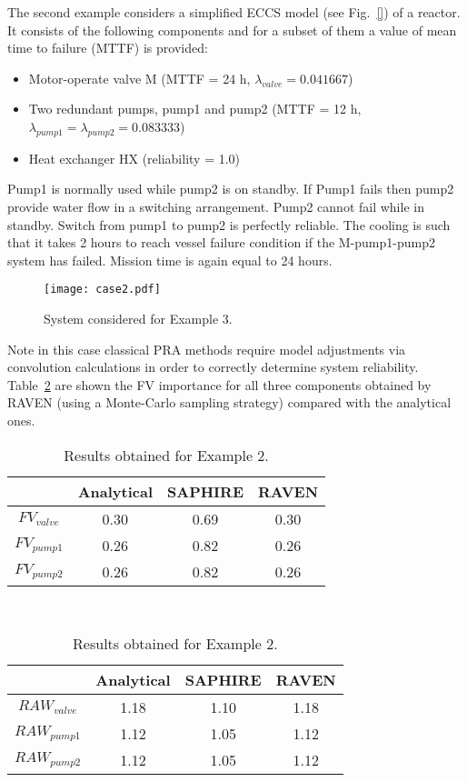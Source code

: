 The second example considers a simplified ECCS model (see Fig.~\ref{}) of a reactor. 
It consists of the following components and for a subset of them a 
value of mean time to failure (MTTF) is provided:
\begin{itemize}
  \item Motor-operate valve M (MTTF = 24 h, $\lambda_{valve} = 0.041667$)
  \item Two redundant pumps, pump1 and pump2 
        (MTTF = 12 h, $\lambda_{pump1} = \lambda_{pump2} = 0.083333$)
  \item Heat exchanger HX (reliability = 1.0)
\end{itemize}

Pump1 is normally used while pump2 is on standby. If Pump1 fails then pump2 provide water flow 
in a switching arrangement. 
Pump2 cannot fail while in standby. Switch from pump1 to pump2 is perfectly reliable. 
The cooling is such that it takes 2 hours to reach vessel failure condition if the 
M-pump1-pump2 
system has failed. Mission time is again equal to 24 hours.

\begin{figure}
    \centering
    \centerline{\texttt{[image: case2.pdf]}}
    \caption{System considered for Example 3.}
    \label{fig:example3}
\end{figure}

Note in this case classical PRA methods require model adjustments via convolution calculations
in order to correctly 
determine system reliability.
Table~\ref{tab:example2} are shown the FV importance for all three components obtained by RAVEN (using a Monte-Carlo 
sampling strategy) compared with the analytical ones.

\begin{table}
    \caption{Results obtained for Example 2.}
    \begin{minipage}{.5\linewidth}
      \centering
      \begin{tabular}{c | c | c | c} 
        \hline 
         & Analytical & SAPHIRE & RAVEN \\ 
        \hline 
        $FV_{valve}$ & 0.30 & 0.69 & 0.30 \\
        $FV_{pump1}$ & 0.26 & 0.82 & 0.26 \\
        $FV_{pump2}$ & 0.26 & 0.82 & 0.26 \\
        \hline 
      \end{tabular}
    \end{minipage} \\
    \begin{minipage}{.5\linewidth}
      \centering
      \begin{tabular}{c | c | c | c} 
        \hline 
         & Analytical & SAPHIRE & RAVEN \\ 
        \hline 
        $RAW_{valve}$ & 1.18 & 1.10 & 1.18 \\
        $RAW_{pump1}$ & 1.12 & 1.05 & 1.12 \\
        $RAW_{pump2}$ & 1.12 & 1.05 & 1.12 \\
        \hline 
      \end{tabular}
    \end{minipage} 
    \label{tab:example2}
\end{table}



